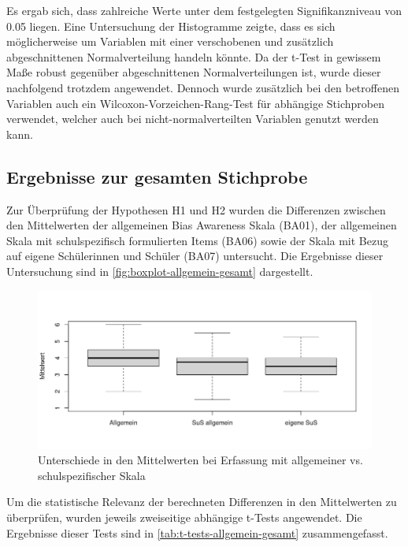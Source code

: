 Es ergab sich, dass zahlreiche Werte unter dem festgelegten Signifikanzniveau von 0.05 liegen.
Eine Untersuchung der Histogramme zeigte, dass es sich möglicherweise um Variablen mit einer verschobenen und zusätzlich abgeschnittenen Normalverteilung handeln könnte.
Da der t-Test in gewissem Maße robust gegenüber abgeschnittenen Normalverteilungen ist, wurde dieser nachfolgend trotzdem angewendet.
Dennoch wurde zusätzlich bei den betroffenen Variablen auch ein Wilcoxon-Vorzeichen-Rang-Test für abhängige Stichproben verwendet, welcher auch bei nicht-normalverteilten Variablen genutzt werden kann.

\subsection{Ergebnisse zur gesamten Stichprobe}
\label{subsec:ergebnisse-gesamt}

Zur Überprüfung der Hypothesen H1 und H2 wurden die Differenzen zwischen den Mittelwerten der allgemeinen Bias Awareness Skala (BA01), der allgemeinen Skala mit schulspezifisch formulierten Items (BA06) sowie der Skala mit Bezug auf eigene Schülerinnen und Schüler (BA07) untersucht.
Die Ergebnisse dieser Untersuchung sind in \autoref{fig:boxplot-allgemein-gesamt} dargestellt.

\begin{figure}[h!]
	\includegraphics[width=\textwidth]{resources/boxplot-allgemein-gesamt.png}
	\caption{Unterschiede in den Mittelwerten bei Erfassung mit allgemeiner vs. schulspezifischer Skala}
	\label{fig:boxplot-allgemein-gesamt}
\end{figure}

Um die statistische Relevanz der berechneten Differenzen in den Mittelwerten zu überprüfen, wurden jeweils zweiseitige abhängige t-Tests angewendet.
Die Ergebnisse dieser Tests sind in \autoref{tab:t-tests-allgemein-gesamt} zusammengefasst.

